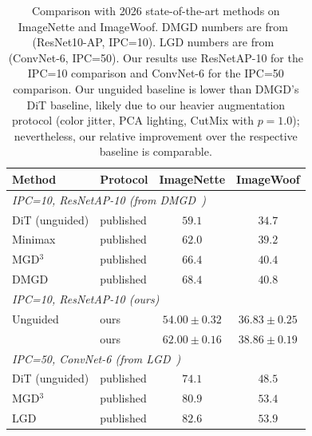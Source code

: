 \begin{table}[t]
\centering
\caption{Comparison with 2026 state-of-the-art methods on ImageNette and ImageWoof. DMGD numbers are from~\cite{wang2026dmgd} (ResNet10-AP, IPC=10). LGD numbers are from~\cite{chansantiago2026learnabilityguided} (ConvNet-6, IPC=50). Our results use ResNetAP-10 for the IPC=10 comparison and ConvNet-6 for the IPC=50 comparison. Our unguided baseline is lower than DMGD's DiT baseline, likely due to our heavier augmentation protocol (color jitter, PCA lighting, CutMix with $p{=}1.0$); nevertheless, our relative improvement over the respective baseline is comparable.}
\label{tab:sota-comparison}
\begin{tabular}{llcc}
\toprule
\textbf{Method} & \textbf{Protocol} & \textbf{ImageNette} & \textbf{ImageWoof} \\
\midrule
\multicolumn{4}{l}{\emph{IPC=10, ResNetAP-10 (from DMGD~\cite{wang2026dmgd})}} \\
DiT (unguided) & published & $59.1$ & $34.7$ \\
Minimax & published & $62.0$ & $39.2$ \\
MGD$^3$ & published & $66.4$ & $40.4$ \\
DMGD & published & $\mathbf{68.4}$ & $\mathbf{40.8}$ \\
\midrule
\multicolumn{4}{l}{\emph{IPC=10, ResNetAP-10 (ours)}} \\
Unguided & ours & $54.00 \pm 0.32$ & $36.83 \pm 0.25$ \\
\cags{} & ours & $62.00 \pm 0.16$ & $38.86 \pm 0.19$ \\
\midrule
\multicolumn{4}{l}{\emph{IPC=50, ConvNet-6 (from LGD~\cite{chansantiago2026learnabilityguided})}} \\
DiT (unguided) & published & $74.1$ & $48.5$ \\
MGD$^3$ & published & $80.9$ & $53.4$ \\
LGD & published & $\mathbf{82.6}$ & $\mathbf{53.9}$ \\
\bottomrule
\end{tabular}
\end{table}

